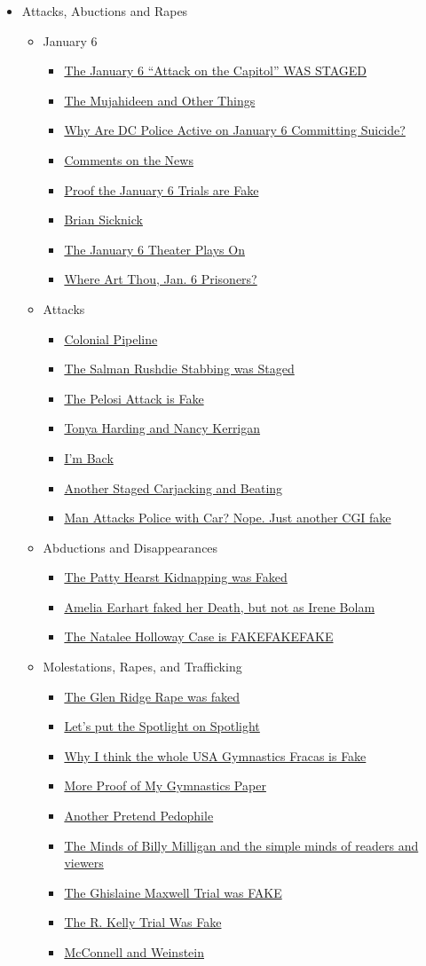 \documentclass{article}
\newcommand{\insertmydocument}[2]{ %
  \item \href{http://www.mileswmathis.com/#2}{#1}
}
\begin{document}
\begin{itemize}
  \item Attacks, Abuctions and Rapes
  \begin{itemize}

    \item January 6
    \begin{itemize}

      \insertmydocument{The January 6 “Attack on the Capitol” WAS STAGED}{jan6.pdf}
      \insertmydocument{The Mujahideen and Other Things}{muja.pdf}
      \insertmydocument{Why Are DC Police Active on January 6 Committing Suicide?}{desantis.pdf}
      \insertmydocument{Comments on the News}{news.pdf}
      \insertmydocument{Proof the January 6 Trials are Fake}{reffitt.pdf}
      \insertmydocument{Brian Sicknick}{sick.pdf}
      \insertmydocument{The January 6 Theater Plays On}{munn.pdf}
      \insertmydocument{Where Art Thou, Jan. 6 Prisoners?}{tarrio.pdf}

    \end{itemize}

    \item Attacks
    \begin{itemize}

      \insertmydocument{Colonial Pipeline}{pipe.pdf}
      \insertmydocument{The Salman Rushdie Stabbing was Staged}{rushdie.pdf}
      \insertmydocument{The Pelosi Attack is Fake}{pelosi.pdf}
      \insertmydocument{Tonya Harding and Nancy Kerrigan}{harding.pdf}
      \insertmydocument{I'm Back}{breton.pdf}
      \insertmydocument{Another Staged Carjacking and Beating}{shiva.pdf}
      \insertmydocument{Man Attacks Police with Car? Nope. Just another CGI fake}{axon.pdf}

    \end{itemize}

    \item Abductions and Disappearances
    \begin{itemize}

      \insertmydocument{The Patty Hearst Kidnapping was Faked}{hearst.pdf}
      \insertmydocument{Amelia Earhart faked her Death, but not as Irene Bolam}{amelia.pdf}
      \insertmydocument{The Natalee Holloway Case is FAKEFAKEFAKE}{hollo.pdf}
    \end{itemize}

    \item Molestations, Rapes, and Trafficking
    \begin{itemize}

      \insertmydocument{The Glen Ridge Rape was faked}{glen.pdf}
      \insertmydocument{Let's put the Spotlight on Spotlight}{spot.pdf}
      \insertmydocument{Why I think the whole USA Gymnastics Fracas is Fake}{gymnassar.pdf}
      \insertmydocument{More Proof of My Gymnastics Paper}{biles.pdf}
      \insertmydocument{Another Pretend Pedophile}{vahey.pdf}
      \insertmydocument{The Minds of Billy Milligan and the simple minds of readers and viewers}{algernon.pdf}
      \insertmydocument{The Ghislaine Maxwell Trial was FAKE}{carlyle.pdf}
      \insertmydocument{The R. Kelly Trial Was Fake}{rkelly.pdf}
      \insertmydocument{McConnell and Weinstein}{siebel.pdf}
    \end{itemize}


\end{itemize}
\end{itemize}
\end{document}
